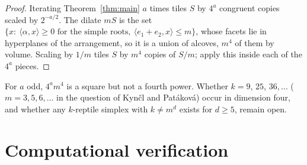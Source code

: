 \documentclass[11pt]{article}
\theoremstyle{remark}
\begin{document}
\begin{proof}
Iterating Theorem~\ref{thm:main} $a$ times tiles $S$ by $4^a$ congruent
copies scaled by $2^{-a/2}$. The dilate $mS$ is the set
$\{x:\ \langle\alpha,x\rangle\ge0 \text{ for the simple roots},\
\langle e_1+e_2,x\rangle\le m\}$, whose facets lie in hyperplanes of the
arrangement, so it is a union of alcoves, $m^4$ of them by volume. Scaling
by $1/m$ tiles $S$ by $m^4$ copies of $S/m$; apply this inside each of the
$4^a$ pieces.
\end{proof}

For $a$ odd, $4^am^4$ is a square but not a fourth power. Whether $k=9$,
$25$, $36,\dots$ ($m=3,5,6,\dots$ in the question of Kynčl and Patáková)
occur in dimension four, and whether any $k$-reptile simplex with
$k\ne m^d$ exists for $d\ge5$, remain open.

\section{Computational verification}\label{sec:verification}
\end{document}
